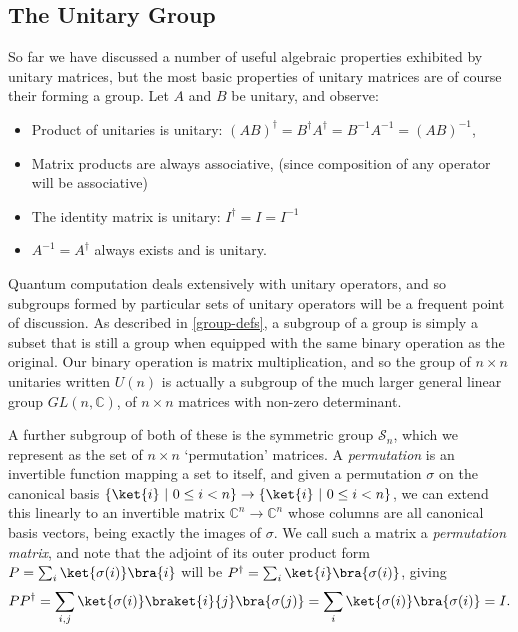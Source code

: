 \subsection{The Unitary Group}
So far we have discussed a number of useful algebraic properties exhibited by unitary matrices, but the most basic properties of unitary matrices are of course their forming a group. Let $A$ and $B$ be unitary, and observe:
\begin{itemize}
	\item Product of unitaries is unitary: ${(AB)}^\dagger = B^\dagger A^\dagger = B^{-1}A^{-1} = {(AB)}^{-1}$,
	\item Matrix products are always associative, (since composition of any operator will be associative)
	\item The identity matrix is unitary: $I^\dagger = I = I^{-1}$
	\item $A^{-1} = A^\dagger$ always exists and is unitary.
\end{itemize}

Quantum computation deals extensively with unitary operators, and so subgroups formed by particular sets of unitary operators will be a frequent point of discussion. As described in \autoref{group-defs}, a subgroup of a group is simply a subset that is still a group when equipped with the same binary operation as the original. Our binary operation is matrix multiplication, and so the group of $n \times n$ unitaries written $U(n)$ is actually a subgroup of the much larger general linear group $GL(n, \mathbb{C})$, of $n \times n$ matrices with non-zero determinant.

A further subgroup of both of these is the symmetric group $\mathcal{S}_n$, which we represent as the set of $n \times n$ `permutation' matrices. A \emph{permutation} is an invertible function mapping a set to itself, and given a permutation $\sigma$ on the canonical basis $\{\ket{i}\ |\ 0 \leq i < n\} \to \{\ket{i}\ |\ 0 \leq i < n\}$, we can extend this linearly to an invertible matrix $\mathbb{C}^n \to \mathbb{C}^n$ whose columns are all canonical basis vectors, being exactly the images of $\sigma$. We call such a matrix a \emph{permutation matrix}, and note that the adjoint of its outer product form $P = \sum_i \ket{\sigma(i)}\bra{i}$ will be $P^{\dagger} = \sum_i \ket{i}\bra{\sigma(i)}$, giving
\begin{align*}
	PP^\dagger = \sum_{i,j} \ket{\sigma(i)}\braket{i}{j}\bra{\sigma(j)} = \sum_i \ket{\sigma(i)}\bra{\sigma(i)} = I.
\end{align*}

